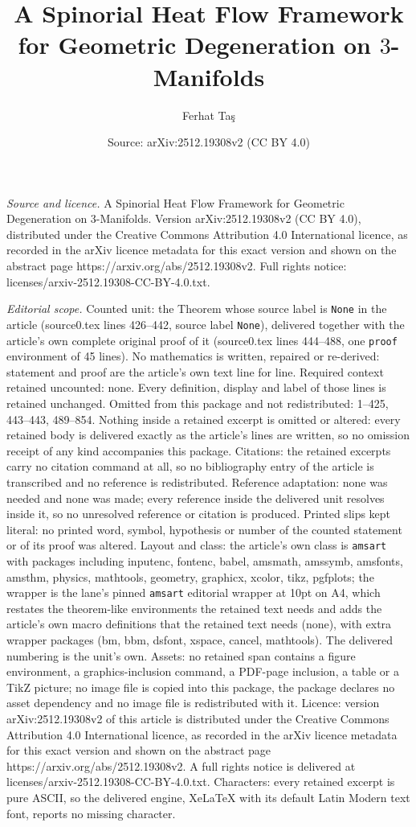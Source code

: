 \documentclass[10pt,a4paper]{amsart}
\title[A Spinorial Heat Flow Framework for Geometric Degeneration o]{A Spinorial Heat Flow Framework for Geometric Degeneration on $3$-Manifolds}
\author{Ferhat Ta\c{s}}
\date{Source: arXiv:2512.19308v2 (CC BY 4.0)}
\begin{document}
\maketitle

\noindent\emph{Source and licence.} A Spinorial Heat Flow Framework for Geometric Degeneration on $3$-Manifolds. Version arXiv:2512.19308v2 (CC BY 4.0), distributed under the Creative Commons Attribution 4.0 International licence, as recorded in the arXiv licence metadata for this exact version and shown on the abstract page https://arxiv.org/abs/2512.19308v2. Full rights notice: licenses/arxiv-2512.19308-CC-BY-4.0.txt.\par\smallskip

\noindent\textit{Editorial scope.} Counted unit: the Theorem whose source label is \texttt{None} in the article (source0.tex lines 426--442, source label \texttt{None}), delivered together with the article's own complete original proof of it (source0.tex lines 444--488, one \texttt{proof} environment of 45 lines). No mathematics is written, repaired or re-derived: statement and proof are the article's own text line for line. Required context retained uncounted: none. Every definition, display and label of those lines is retained unchanged. Omitted from this package and not redistributed: 1--425, 443--443, 489--854. Nothing inside a retained excerpt is omitted or altered: every retained body is delivered exactly as the article's lines are written, so no omission receipt of any kind accompanies this package. Citations: the retained excerpts carry no citation command at all, so no bibliography entry of the article is transcribed and no reference is redistributed. Reference adaptation: none was needed and none was made; every reference inside the delivered unit resolves inside it, so no unresolved reference or citation is produced. Printed slips kept literal: no printed word, symbol, hypothesis or number of the counted statement or of its proof was altered. Layout and class: the article's own class is \texttt{amsart} with packages including inputenc, fontenc, babel, amsmath, amssymb, amsfonts, amsthm, physics, mathtools, geometry, graphicx, xcolor, tikz, pgfplots; the wrapper is the lane's pinned \texttt{amsart} editorial wrapper at 10pt on A4, which restates the theorem-like environments the retained text needs and adds the article's own macro definitions that the retained text needs (none), with extra wrapper packages (bm, bbm, dsfont, xspace, cancel, mathtools). The delivered numbering is the unit's own. Assets: no retained span contains a figure environment, a graphics-inclusion command, a PDF-page inclusion, a table or a TikZ picture; no image file is copied into this package, the package declares no asset dependency and no image file is redistributed with it. Licence: version arXiv:2512.19308v2 of this article is distributed under the Creative Commons Attribution 4.0 International licence, as recorded in the arXiv licence metadata for this exact version and shown on the abstract page https://arxiv.org/abs/2512.19308v2. A full rights notice is delivered at licenses/arxiv-2512.19308-CC-BY-4.0.txt. Characters: every retained excerpt is pure ASCII, so the delivered engine, XeLaTeX with its default Latin Modern text font, reports no missing character.
\end{document}
